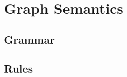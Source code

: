 \documentclass{article}
\begin{document}


    \section{Graph Semantics}

      \subsection{Grammar}

      \begin{grammar}
        \grule[graph]{\ggraph}{ \{\gedge, \ldots\} }
        \grule[edges]{\gedge}{
                    \gnode \gsBefore \gnode
            \gor    \gnode \gsSkip \gnode
        }
        \grule[nodes]{\gnode}{
                    \gsstart
            \gor    \gsend
            \gor    \gsLR{\olbl, \omstack, \gtime}
            \gor    \gsLR{\genter \olbl, \gtime}
            \gor    \gsLR{\gleave \olbl, \gtime}
        }

      \end{grammar}

      \subsection{Rules}
\end{document}
